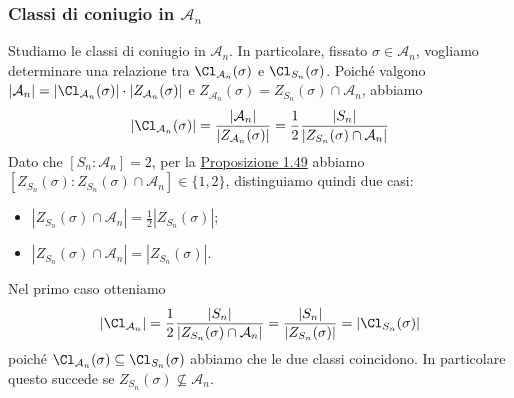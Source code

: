 \documentclass[11pt]{scrartcl}
\begin{document}
\subsubsection{Classi di coniugio in $\mathcal{A}_n$}

Studiamo le classi di coniugio in $\mathcal{A}_n$. In particolare,
fissato $\sigma \in \mathcal{A}_n$, vogliamo determinare una relazione tra
$\Cl_{\mathcal{A}_n}(\sigma)$ e $\Cl_{S_n}(\sigma)$.
Poiché valgono $|\mathcal{A}_n| = |\Cl_{\mathcal{A}_n}(\sigma)|\cdot |Z_{\mathcal{A}_n}(\sigma)|$
e $Z_{\mathcal{A}_n}(\sigma) = Z_{S_n}(\sigma) \cap \mathcal{A}_n$, abbiamo
\[
    |\Cl_{\mathcal{A}_n}(\sigma)| = \frac{|\mathcal{A}_n|}{|Z_{\mathcal{A}_n}(\sigma)|} =
    \frac 1 2 \frac{|S_n|}{|Z_{S_n}(\sigma) \cap \mathcal{A}_n|}
\]
Dato che $[S_n:\mathcal{A}_n] = 2$, per la \hyperref[prop1.49]{Proposizione 1.49}
abbiamo $[Z_{S_n}(\sigma):Z_{S_n}(\sigma) \cap \mathcal{A}_n] \in \{1, 2\}$,
distinguiamo quindi due casi:
\begin{itemize}
    \item $|Z_{S_n}(\sigma) \cap \mathcal{A}_n| = \displaystyle\frac 1 2 |Z_{S_n}(\sigma)|$;
    \item $|Z_{S_n}(\sigma) \cap \mathcal{A}_n| = |Z_{S_n}(\sigma)|$.
\end{itemize}

Nel primo caso otteniamo 
\[
    |\Cl_{\mathcal{A}_n}| = \frac 1 2 \frac{|S_n|}{|Z_{S_n}(\sigma) \cap \mathcal{A}_n|} =
    \frac{|S_n|}{|Z_{S_n}(\sigma)|} = |\Cl_{S_n}(\sigma)|
\]
poiché $\Cl_{\mathcal{A}_n}(\sigma)\subseteq \Cl_{S_n}(\sigma)$ abbiamo che le
due classi coincidono. In particolare questo succede se $Z_{S_n}(\sigma)
\nsubseteq \mathcal{A}_n$.
\end{document}
